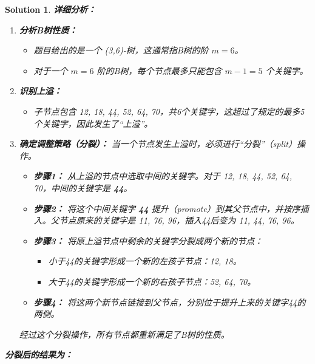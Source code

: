 \documentclass[UTF8]{report}
\newtheorem{solution}{Solution}
\theoremstyle{MyLineTheoremStyle} %
\theoremstyle{MyBlockTheoremStyle} %
\theoremstyle{MySubsubsectionStyle} %
\begin{document}
\begin{solution}
\textbf{详细分析：}

\begin{enumerate}
    \item \textbf{分析B树性质：}
    \begin{itemize}
        \item 题目给出的是一个 (3,6)-树，这通常指B树的阶 $m=6$。
        \item 对于一个 $m=6$ 阶的B树，每个节点最多只能包含 $m-1 = 5$ 个关键字。
    \end{itemize}

    \item \textbf{识别上溢：}
    \begin{itemize}
        \item 子节点包含 {12, 18, 44, 52, 64, 70}，共6个关键字，这超过了规定的最多5个关键字，因此发生了“上溢”。
    \end{itemize}

    \item \textbf{确定调整策略（分裂）：}
    当一个节点发生上溢时，必须进行“分裂”（split）操作。
    \begin{itemize}
        \item \textbf{步骤1：} 从上溢的节点中选取中间的关键字。对于 {12, 18, 44, 52, 64, 70}，中间的关键字是 \textbf{44}。
        \item \textbf{步骤2：} 将这个中间关键字 \textbf{44} 提升（promote）到其父节点中，并按序插入。父节点原来的关键字是 {11, 76, 96}，插入44后变为 {11, 44, 76, 96}。
        \item \textbf{步骤3：} 将原上溢节点中剩余的关键字分裂成两个新的节点：
            \begin{itemize}
                \item 小于44的关键字形成一个新的左孩子节点：{12, 18}。
                \item 大于44的关键字形成一个新的右孩子节点：{52, 64, 70}。
            \end{itemize}
        \item \textbf{步骤4：} 将这两个新节点链接到父节点，分别位于提升上来的关键字44的两侧。
    \end{itemize}
    经过这个分裂操作，所有节点都重新满足了B树的性质。

\end{enumerate}


\textbf{分裂后的结果为：}
\begin{center}
\end{center}
\end{solution}
\end{document}

